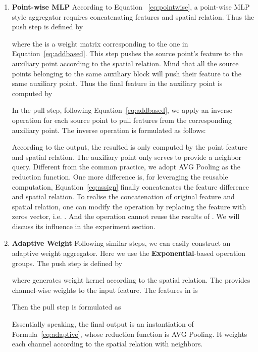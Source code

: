 \documentclass[journal]{IEEEtran}
\begin{document}
\begin{enumerate}
    \item {\bf Point-wise MLP} According to Equation ~\ref{eq:pointwise}, a point-wise MLP style aggregator requires concatenating features and spatial relation. Thus the push step is defined by

    

    \noindent
    where the  is a weight matrix corresponding to the one in Equation~\ref{eq:addbased}. This step pushes the source point's feature to the auxiliary point according to the spatial relation. Mind that all the source points belonging to the same auxiliary block will push their feature to the same auxiliary point. Thus the final feature in the auxiliary point is computed by
    
    \small
    
    
    \noindent
    In the pull step, following Equation~\ref{eq:addbased}, we apply an inverse operation for each source point to pull features from the corresponding auxiliary point. The inverse operation is formulated as follows:
    
    \small
    
    
    According to the output, the resulted  is only computed by the point feature and spatial relation. The auxiliary point  only serves to provide a neighbor query. Different from the common practice, we adopt AVG Pooling as the reduction function. One more difference is, for leveraging the reusable computation, Equation~\ref{eq:assign} finally concatenates the feature difference and spatial relation. To realise the concatenation of original feature and spatial relation, one can modify the  operation by replacing the feature with zeros vector, i.e. . And the  operation cannot reuse the results of . We will discuss its influence in the experiment section.
    
    \item {\bf Adaptive Weight} Following similar steps, we can easily construct an adaptive weight aggregator. Here we use the {\bf Exponential}-based operation groups. The push step is defined by
    
    
    
    \noindent
    where  generates weight kernel according to the spatial relation. The  provides channel-wise weights to the input feature. The features in  is 
    
    
    
    Then the pull step is formulated as 
    
    

    \noindent
    Essentially speaking, the final output is an instantiation of Formula~\ref{eq:adaptive}, whose reduction function is AVG Pooling. It weights each channel according to the spatial relation with neighbors.
    
\end{enumerate}
\end{document}
